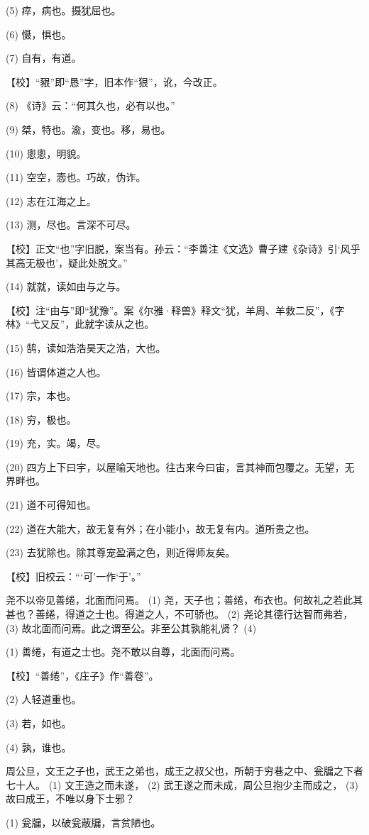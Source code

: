 \documentclass[12pt,UTF8]{ctexbook}
\begin{document}
(5) 瘁，病也。摄犹屈也。

(6) 慑，惧也。

(7) 自有，有道。

【校】“豤”即“恳”字，旧本作“狠”，讹，今改正。

(8) 《诗》云：“何其久也，必有以也。”

(9) 桀，特也。渝，变也。移，易也。

(10) 悤悤，明貌。

(11) 空空，悫也。巧故，伪诈。

(12) 志在江海之上。

(13) 测，尽也。言深不可尽。

【校】正文“也”字旧脱，案当有。孙云：“李善注《文选》曹子建《杂诗》引‘风乎其高无极也’，疑此处脱文。”

(14) 就就，读如由与之与。

【校】注“由与”即“犹豫”。案《尔雅·释兽》释文“犹，羊周、羊救二反”，《字林》“弋又反”，此就字读从之也。

(15) 鹄，读如浩浩昊天之浩，大也。

(16) 皆谓体道之人也。

(17) 宗，本也。

(18) 穷，极也。

(19) 充，实。竭，尽。

(20) 四方上下曰宇，以屋喻天地也。往古来今曰宙，言其神而包覆之。无望，无界畔也。

(21) 道不可得知也。

(22) 道在大能大，故无复有外；在小能小，故无复有内。道所贵之也。

(23) 去犹除也。除其尊宠盈满之色，则近得师友矣。

【校】旧校云：“‘可’一作‘于’。”

尧不以帝见善绻，北面而问焉。 (1) 尧，天子也；善绻，布衣也。何故礼之若此其甚也？善绻，得道之士也。得道之人，不可骄也。 (2) 尧论其德行达智而弗若， (3) 故北面而问焉。此之谓至公。非至公其孰能礼贤？ (4)

(1) 善绻，有道之士也。尧不敢以自尊，北面而问焉。

【校】“善绻”，《庄子》作“善卷”。

(2) 人轻道重也。

(3) 若，如也。

(4) 孰，谁也。

周公旦，文王之子也，武王之弟也，成王之叔父也，所朝于穷巷之中、瓮牖之下者七十人。 (1) 文王造之而未遂， (2) 武王遂之而未成，周公旦抱少主而成之， (3) 故曰成王，不唯以身下士邪？

(1) 瓮牖，以破瓮蔽牖，言贫陋也。
\end{document}
